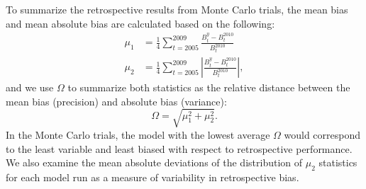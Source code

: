 To summarize the retrospective results from Monte Carlo trials, the mean bias and mean absolute bias are calculated based on the following:
\begin{align}
    \mu_1   &= \frac{1}{4} \sum_{t=2005}^{2009} \frac{B_t^y-B_t^{2010}}{B_t^{2010}}\label{eq:5}\\
    \mu_2 &= \frac{1}{4} \sum_{t=2005}^{2009}\left| \frac{B_t^y-B_t^{2010}}{B_t^{2010}}\right|, \label{eq:6}
\end{align}
and we use $\Omega$ to summarize both statistics as the relative distance between the mean bias (precision) and absolute bias (variance):
\begin{equation} \label{eq:7}
    \Omega = \sqrt{\mu_1^2 + \mu_2^2 }.	
\end{equation}
In the Monte Carlo trials, the model with the lowest average $\Omega$ would correspond to the least variable and least biased with respect to retrospective performance.  We also examine the mean absolute deviations of the distribution of $\mu_2$ statistics for each model run as a measure of variability in retrospective bias. %





